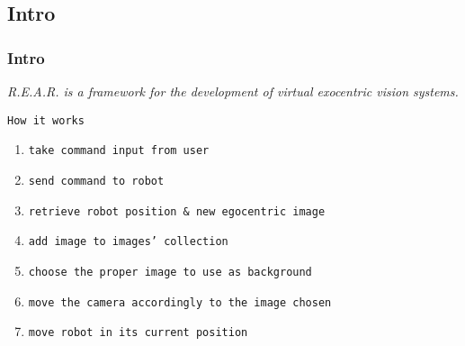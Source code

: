 \subsection{Intro}
\frame
{
  \frametitle{Intro}
  
  \emph{\textit{R.E.A.R.} is a framework for the
    development of \textit{virtual exocentric vision systems}.}
  \pause
  
  \vskip15pt


  \begin{block} {\alert{\texttt{How it works}}}
    \begin{enumerate}

      \footnotesize

      \pause
      \item \texttt{take command input from user}
      \pause
      \item \texttt{send command to robot}
      \pause
      \item \texttt{retrieve robot position \& new egocentric image}
      \pause
      \item \texttt{add image to images' collection}
      \pause
      \item \texttt{choose the proper image to use as background}
      \pause
      \item \texttt{move the camera accordingly to the image chosen}
      \pause
      \item \texttt{move robot in its current position}
      
    \end{enumerate}
      
  \end{block}
      
}

